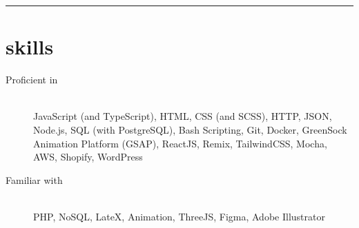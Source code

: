 \begin{samepage}
  \hrule
  \section*{skills}
\end{samepage}


\begin{description}
\item[Proficient in] \hfill \\
  JavaScript (and TypeScript), HTML, CSS (and SCSS), HTTP, JSON, Node.js, SQL
  (with PostgreSQL), Bash Scripting, Git, Docker, GreenSock Animation Platform
  (GSAP), ReactJS, Remix, TailwindCSS, Mocha, AWS, Shopify, WordPress
\item[Familiar with] \hfill \\
  PHP, NoSQL, LateX, Animation, ThreeJS, Figma, Adobe Illustrator
\end{description}
\vspace{1em}
